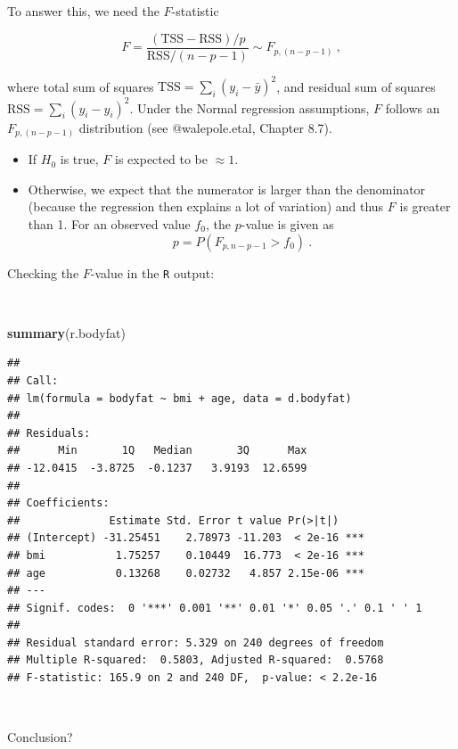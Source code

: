 \documentclass[
  10pt,
  ignorenonframetext,
]{beamer}
\newenvironment{Shaded}{\begin{snugshade}}{\end{snugshade}}
\newcommand{\FunctionTok}[1]{\textcolor[rgb]{0.13,0.29,0.53}{\textbf{#1}}}
\newcommand{\NormalTok}[1]{#1}
\begin{document}
\begin{frame}
\vspace{4mm}

To answer this, we need the \(F\)-statistic

\[F = \frac{(\text{TSS}-\text{RSS})/p}{\text{RSS}/(n-p-1)} \sim F_{p,(n-p-1)}\ ,\]

where total sum of squares \(\text{TSS}=\sum_i(y_i-\bar{y})^2\), and
residual sum of squares \(\text{RSS}=\sum_i(y_i-\hat{y}_i)^2\). Under
the Normal regression assumptions, \(F\) follows an \(F_{p,(n-p-1)}\)
distribution (see @walepole.etal, Chapter 8.7).

\begin{itemize}
\item
  If \(H_0\) is true, \(F\) is expected to be \(\approx 1\).
\item
  Otherwise, we expect that the numerator is larger than the denominator
  (because the regression then explains a lot of variation) and thus
  \(F\) is greater than 1. For an observed value \(f_0\), the
  \(p\)-value is given as \[p =P(F_{p,n-p-1}> f_0) \ .\]
\end{itemize}
\end{frame}

\begin{frame}[fragile]
Checking the \(F\)-value in the \texttt{R} output:

\(~\)

\scriptsize

\begin{Shaded}
\begin{Highlighting}[]
\FunctionTok{summary}\NormalTok{(r.bodyfat)}
\end{Highlighting}
\end{Shaded}

\begin{verbatim}
## 
## Call:
## lm(formula = bodyfat ~ bmi + age, data = d.bodyfat)
## 
## Residuals:
##      Min       1Q   Median       3Q      Max 
## -12.0415  -3.8725  -0.1237   3.9193  12.6599 
## 
## Coefficients:
##              Estimate Std. Error t value Pr(>|t|)    
## (Intercept) -31.25451    2.78973 -11.203  < 2e-16 ***
## bmi           1.75257    0.10449  16.773  < 2e-16 ***
## age           0.13268    0.02732   4.857 2.15e-06 ***
## ---
## Signif. codes:  0 '***' 0.001 '**' 0.01 '*' 0.05 '.' 0.1 ' ' 1
## 
## Residual standard error: 5.329 on 240 degrees of freedom
## Multiple R-squared:  0.5803, Adjusted R-squared:  0.5768 
## F-statistic: 165.9 on 2 and 240 DF,  p-value: < 2.2e-16
\end{verbatim}

\(~\)

\normalsize

Conclusion?
\end{frame}
\end{document}
